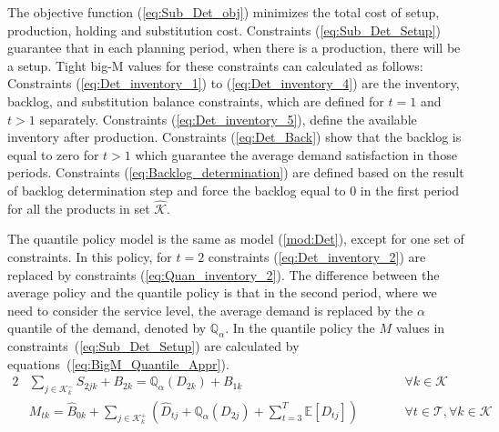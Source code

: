 \documentclass[10pt]{article}
\newcommand{\ti}{t} %
\newcommand{\TI}{\mathcal{T}}
\newcommand{\Ti}{T}
\newcommand{\ka}{k} %
\newcommand{\KA}{\mathcal{K}}
\newcommand{\jey}{j} %
\newcommand{\Csub}{\mathcal{K}^+_k}
\newcommand{\Psub}{\mathcal{K}^-_k}
\newcommand{\cred}{\color{red!65!black}}
\begin{document}
The objective function (\ref{eq:Sub_Det_obj}) minimizes the total cost of setup, production, holding and substitution cost. Constraints (\ref{eq:Sub_Det_Setup}) guarantee that in each planning period, when there is a production, there will be a setup. Tight big-M values for these constraints can calculated as follows:
{\cred{
\begin{alignat}{2}
  &  M_{\ti \ka} = \hat{B}_{0 \ka}+ \sum_{\jey \in  \Csub}\left( {\hat{D}}_{\ti \jey} + \sum_{\ti = 2 }^\Ti \mathbb{E}[{D}_{\ti \jey}]\right)  &&\qquad \forall \ti \in \TI ,\forall \ka \in \KA   
  \label{eq:BigM_Deterministic_Appr}
  \end{alignat}}}
Constraints (\ref{eq:Det_inventory_1}) to (\ref{eq:Det_inventory_4}) are the inventory, backlog, and substitution balance constraints, which are defined for $\ti=1$ and $\ti > 1$ separately. Constraints (\ref{eq:Det_inventory_5}), define the available inventory after production. Constraints (\ref{eq:Det_Back}) show that the backlog is equal to zero for $\ti > 1 $ which guarantee the average demand satisfaction in those periods. Constraints (\ref{eq:Backlog_determination}) are defined based on the result of backlog determination step and force the backlog equal to 0 in the first period for all the products in set $\hat{\KA}$.


The quantile policy model is the same as model (\ref{mod:Det}), except for one set of constraints. In this policy, for $\ti =2$ constraints (\ref{eq:Det_inventory_2}) are replaced by constraints (\ref{eq:Quan_inventory_2}). The difference between the average policy and the quantile policy is that in the second period, where we need to consider the service level, the average demand is replaced by the $\alpha$ quantile of the demand, denoted by $\mathbb{Q}_{\alpha}$. %
In the quantile policy the $M$ values in constraints~(\ref{eq:Sub_Det_Setup}) are calculated by equations~(\ref{eq:BigM_Quantile_Appr}).
\begin{alignat}{2}
    & \sum_{\jey \in  \Psub} {S}_{2 \jey \ka} + B_{2 \ka} = \mathbb{Q}_{\alpha}({D}_{2 \ka}) + {B}_{1 \ka} && \quad \quad \forall \ka \in \KA  \label{eq:Quan_inventory_2} \\
     &  M_{\ti \ka} = \hat{B}_{0 \ka}+ \sum_{\jey \in  \Csub}\left( {\hat{D}}_{\ti \jey} + \mathbb{Q}_{\alpha}({D}_{2 \jey})+ \sum_{\ti =3}^\Ti\mathbb{E}[{D}_{\ti \jey}]\right)  &&\qquad \forall \ti \in \TI , \forall \ka \in \KA   
  \label{eq:BigM_Quantile_Appr}
     \end{alignat}
\end{document}
